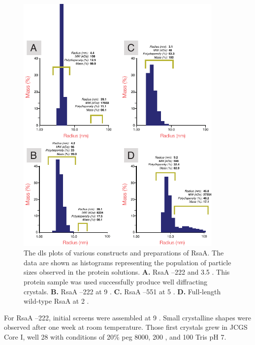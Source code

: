 \begin{figure}[p]
  	\begin{center}
   		\includegraphics[width=0.9\textwidth]{crystal_chapter/img/dls.pdf}
   	\end{center}
   	\caption[\Ac{dls} plots of RsaA constructs]{The \ac{dls} plots of various
      constructs and preparations of RsaA. The data are shown as histograms representing the population of particle sizes observed in the protein solutions. \textbf{A.} RsaA --222 and 3.5 \mgperml. This protein sample was used successfully produce well diffracting crystals. \textbf{B.} RsaA --222 at 9 \mgperml. \textbf{C.} RsaA --551 at 5 \mgperml. \textbf{D.} Full-length wild-type RsaA at 2 \mgperml.}
   	\label{fig:dls}
\end{figure}    

 For RsaA --222, initial screens were assembled at 9 \mgperml. Small crystalline shapes were observed after one week at room temperature. Those first crystals grew in JCGS Core I, well 28 with conditions of 20\% \ac{peg} 8000, 200 \millimolar {}, and 100 \millimolar Tris pH 7.
 
